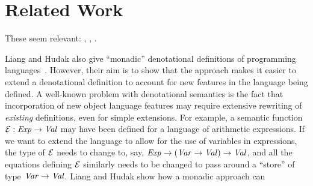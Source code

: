 \documentclass{CRPITStyle}
\newcommand{\ident}[1]{\mbox{\textit{#1}}}
\begin{document}
\section{Related Work}

These seem relevant: 
,
,
.

Liang and Hudak
also give ``monadic'' denotational definitions of programming 
languages~\cite{Liang_Hudak:ESOP1996,Liang:phd1998}.
However, their aim is to show that the approach makes it easier
to extend a denotational definition to account for new features
in the language being defined.
A well-known problem with denotational semantics is
the fact that incorporation of new object language features may require
extensive rewriting of \emph{existing} definitions,
even for simple extensions.
For example, a semantic function 
${\cal E}: \ident{Exp} \rightarrow \ident{Val}$ 
may have been defined for a language of arithmetic expressions.
If we want to extend the language to allow for the use of variables
in expressions, the type of ${\cal E}$ needs to change to, say,
$\ident{Exp} \rightarrow 
(\ident{Var} \rightarrow \ident{Val}) \rightarrow \ident{Val}$,
and all the equations defining ${\cal E}$ similarly needs to be
changed to pass around a ``store'' of type 
$\ident{Var} \rightarrow \ident{Val}$.
Liang and Hudak show how a monadic approach can 





\end{document}
